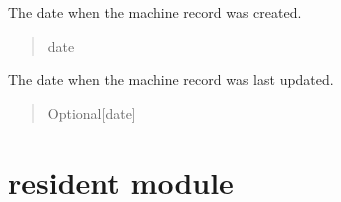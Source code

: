 \documentclass[letterpaper,10pt,english]{sphinxmanual}
\begin{document}
\begin{fulllineitems}
\begin{fulllineitems}
\begin{quote}
\begin{description}
\end{description}\end{quote}

\end{fulllineitems}


\begin{fulllineitems}
\label{\detokenize{app.models:app.models.machine.Machine.createDate}}
\pysigstartsignatures
\pysigline
{}
\pysigstopsignatures
\sphinxAtStartPar
The date when the machine record was created.
\begin{quote}\begin{description}
\sphinxAtStartPar
date

\end{description}\end{quote}

\end{fulllineitems}


\begin{fulllineitems}
\label{\detokenize{app.models:app.models.machine.Machine.update}}
\pysigstartsignatures
\pysigline
{}
\pysigstopsignatures
\sphinxAtStartPar
The date when the machine record was last updated.
\begin{quote}\begin{description}
\sphinxAtStartPar
Optional{[}date{]}

\end{description}\end{quote}

\end{fulllineitems}


\end{fulllineitems}



\section{resident module}
\label{\detokenize{app.models:module-app.models.resident}}\label{\detokenize{app.models:resident-module}}
\end{document}

